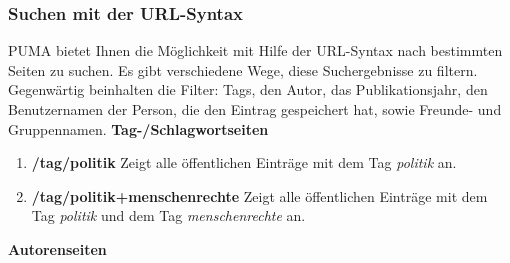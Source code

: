 \documentclass[a4paper,11pt,twoside]{scrbook}
\begin{document}
\subsubsection{Suchen mit der URL-Syntax}
PUMA bietet Ihnen die Möglichkeit mit Hilfe der URL-Syntax nach bestimmten Seiten zu suchen. Es gibt verschiedene Wege, diese Suchergebnisse zu filtern. Gegenwärtig beinhalten die Filter: Tags, den Autor, das Publikationsjahr, den Benutzernamen der Person, die den Eintrag gespeichert hat, sowie Freunde- und Gruppennamen. \newline
\newline
\textbf{Tag-/Schlagwortseiten}
\begin{enumerate}
    \item \textbf{/tag/politik} \newline
    Zeigt alle öffentlichen Einträge mit dem Tag \textit{politik} an.
    \item \textbf{/tag/politik+menschenrechte}\newline
    Zeigt alle öffentlichen Einträge mit dem Tag \textit{politik} und dem Tag \textit{menschenrechte} an.
\end{enumerate}
\textbf{Autorenseiten}
\end{document}
